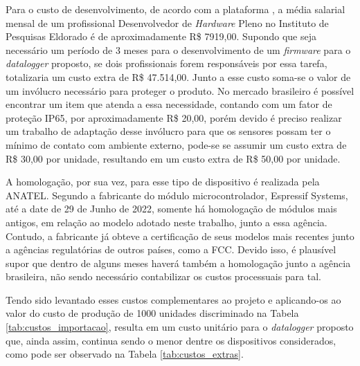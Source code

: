 Para o custo de desenvolvimento, de acordo com a plataforma , a média salarial mensal de um profissional Desenvolvedor de \textit{Hardware} Pleno no Instituto de Pesquisas Eldorado é de aproximadamente R\$ 7919,00. Supondo que seja necessário um período de 3 meses para o desenvolvimento de um \textit{firmware} para o \textit{datalogger} proposto, se dois profissionais forem responsáveis por essa tarefa, totalizaria um custo extra de R\$ 47.514,00. Junto a esse custo soma-se o valor de um invólucro necessário para proteger o produto. No mercado brasileiro é possível encontrar um item que atenda a essa necessidade, contando com um fator de proteção IP65, por aproximadamente R\$ 20,00, porém devido é preciso realizar um trabalho de adaptação desse invólucro para que os sensores possam ter o mínimo de contato com ambiente externo, pode-se se assumir um custo extra de R\$ 30,00 por unidade, resultando em um custo extra de R\$ 50,00 por unidade. 

A homologação, por sua vez, para esse tipo de dispositivo é realizada pela \gls{ANATEL}. Segundo a fabricante do módulo microcontrolador, Espressif Systems, até a date de 29 de Junho de 2022, somente há homologação de módulos mais antigos, em relação ao modelo adotado neste trabalho, junto a essa agência. Contudo, a fabricante já obteve a certificação de seus modelos mais recentes junto a agências regulatórias de outros países, como a \gls{FCC}. Devido isso, é plausível supor que dentro de alguns meses haverá também a homologação junto a agência brasileira, não sendo necessário contabilizar os custos processuais para tal. 

Tendo sido levantado esses custos complementares ao projeto e aplicando-os ao valor do custo de produção de 1000 unidades discriminado na Tabela \ref{tab:custos_importacao}, resulta em um custo unitário para o \textit{datalogger} proposto que, ainda assim, continua sendo o menor dentre os dispositivos considerados, como pode ser observado na Tabela \ref{tab:custos_extras}.

